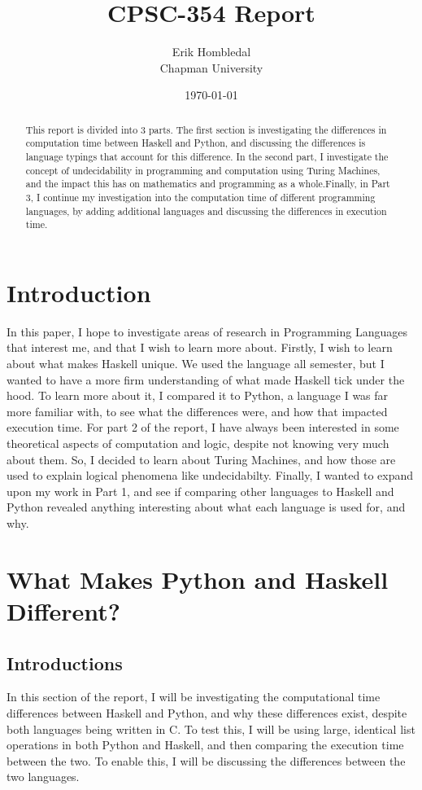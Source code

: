 \documentclass{article}
\title{CPSC-354 Report}
\author{Erik Hombledal \\ Chapman University}
\date{\today}
\begin{document}
\maketitle

\begin{abstract}
This report is divided into 3 parts. The first section is investigating the differences in computation time between Haskell and Python, and discussing the differences is language typings that account for this difference. In the second part, I investigate the concept of undecidability in programming and computation using Turing Machines, and the impact this has on mathematics and programming as a whole.Finally, in Part 3, I continue my investigation into the computation time of different programming languages, by adding additional languages and discussing the differences in execution time.
\end{abstract}

\tableofcontents

\section{Introduction}\label{intro}
\medskip\noindent In this paper, I hope to investigate areas of research in Programming Languages that interest me, and that I wish to learn more about. Firstly, I wish to learn about what makes Haskell unique. We used the language all semester, but I wanted to have a more firm understanding of what made Haskell tick under the hood. To learn more about it, I compared it to Python, a language I was far more familiar with, to see what the differences were, and how that impacted execution time. For part 2 of the report, I have always been interested in some theoretical aspects of computation and logic, despite not knowing very much about them. So, I decided to learn about Turing Machines, and how those are used to explain logical phenomena like undecidabilty. Finally, I wanted to expand upon my work in Part 1, and see if comparing other languages to Haskell and Python revealed anything interesting about what each language is used for, and why. 

\section{What Makes Python and Haskell Different?}
    \subsection {Introductions}
    In this section of the report, I will be investigating the computational time differences between Haskell and Python, and why these differences exist, despite both languages being written in C. To test this, I will be using large, identical list operations in both Python and Haskell, and then comparing the execution time between the two. To enable this, I will be discussing the differences between the two languages. 
\end{document}
